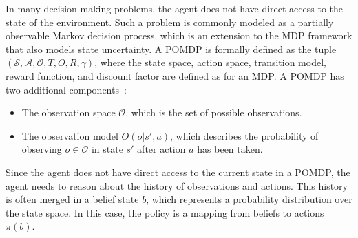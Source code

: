 

In many decision-making problems, the agent does not have direct access to the state of the environment. Such a problem is commonly modeled as a partially observable Markov decision process, which is an extension to the MDP framework that also models state uncertainty. A POMDP is formally defined as the tuple  $( \mathcal{S}, \mathcal{A}, \mathcal{O}, T, O, R, \gamma )$, where the state space, action space, transition model, reward function, and discount factor are defined as for an MDP. A POMDP has two additional components~\cite[Ch. 6]{Kochenderfer2015}:
%
\begin{itemize}
    \item The observation space $\mathcal{O}$, which is the set of possible observations.
    \item The observation model $O(o|s',a)$, which describes the probability of observing $o \in \mathcal{O}$ in state $s'$ after action $a$ has been taken.
\end{itemize}
%
Since the agent does not have direct access to the current state in a POMDP, the agent needs to reason about the history of observations and actions. This history is often merged in a belief state $b$, which represents a probability distribution over the state space. In this case, the policy is a mapping from beliefs to actions $\pi(b)$.



